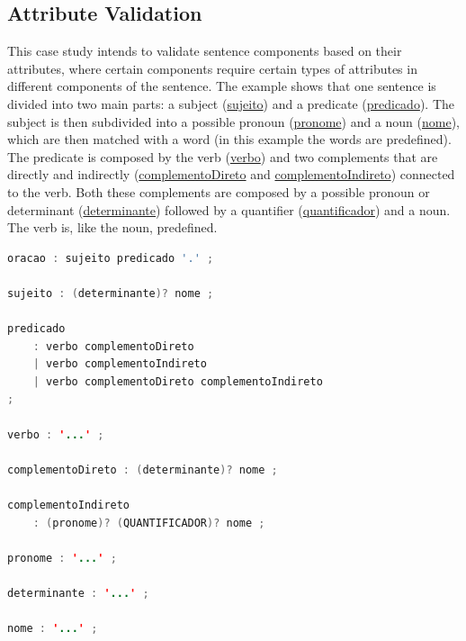 \subsection{Attribute Validation}
This case study intends to validate sentence components based on their attributes, where certain components require certain types of attributes in different components of the sentence. The example shows that one sentence is divided into two main parts: a subject (\underline{sujeito}) and a predicate (\underline{predicado}). The subject is then subdivided into a possible pronoun (\underline{pronome}) and a noun (\underline{nome}), which are then matched with a word (in this example the words are predefined). The predicate is composed by the verb (\underline{verbo}) and two complements that are directly and indirectly (\underline{complementoDireto} and \underline{complementoIndireto}) connected to the verb. Both these complements are composed by a possible pronoun or determinant (\underline{determinante}) followed by a quantifier (\underline{quantificador}) and a noun. The verb is, like the noun, predefined.

\begin{center}
\begin{minipage}{12cm}
\begin{lstlisting}[language=java, basicstyle=\small, label={lst:case_study_sentence}, caption=Example of a possible sentence grammar]
oracao : sujeito predicado '.' ;

sujeito : (determinante)? nome ;

predicado 
    : verbo complementoDireto
    | verbo complementoIndireto
    | verbo complementoDireto complementoIndireto
;

verbo : '...' ;

complementoDireto : (determinante)? nome ;

complementoIndireto 
    : (pronome)? (QUANTIFICADOR)? nome ;

pronome : '...' ;

determinante : '...' ;

nome : '...' ;
\end{lstlisting}
\end{minipage}
\end{center}

%
%
%
%
%
%
%
%

